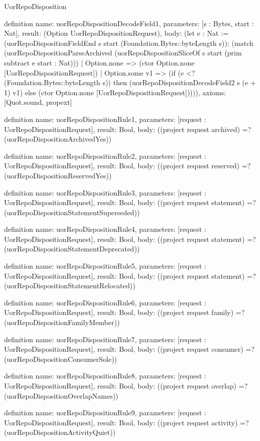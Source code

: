 \begin{lexlean}{UorRepoDisposition}
\begin{semanticmodule}
definition{
  name: uorRepoDispositionDecodeField1,
  parameters: [s : Bytes, start : Nat],
  result: (Option UorRepoDispositionRequest),
  body: (let e : Nat := (uorRepoDispositionFieldEnd s start (Foundation.Bytes::byteLength s)); (match (uorRepoDispositionParseArchived (uorRepoDispositionSliceOf s start (prim subtract e start : Nat)))
    | Option.none => (ctor Option.none [UorRepoDispositionRequest])
    | Option.some v1 => (if (e <? (Foundation.Bytes::byteLength s)) then (uorRepoDispositionDecodeField2 s (e + 1) v1) else (ctor Option.none [UorRepoDispositionRequest])))),
  axioms: [Quot.sound, propext]
}

definition{
  name: uorRepoDispositionRule1,
  parameters: [request : UorRepoDispositionRequest],
  result: Bool,
  body: ((project request archived) =? (uorRepoDispositionArchivedYes))
}

definition{
  name: uorRepoDispositionRule2,
  parameters: [request : UorRepoDispositionRequest],
  result: Bool,
  body: ((project request reserved) =? (uorRepoDispositionReservedYes))
}

definition{
  name: uorRepoDispositionRule3,
  parameters: [request : UorRepoDispositionRequest],
  result: Bool,
  body: ((project request statement) =? (uorRepoDispositionStatementSuperseded))
}

definition{
  name: uorRepoDispositionRule4,
  parameters: [request : UorRepoDispositionRequest],
  result: Bool,
  body: ((project request statement) =? (uorRepoDispositionStatementDeprecated))
}

definition{
  name: uorRepoDispositionRule5,
  parameters: [request : UorRepoDispositionRequest],
  result: Bool,
  body: ((project request statement) =? (uorRepoDispositionStatementRelocated))
}

definition{
  name: uorRepoDispositionRule6,
  parameters: [request : UorRepoDispositionRequest],
  result: Bool,
  body: ((project request family) =? (uorRepoDispositionFamilyMember))
}

definition{
  name: uorRepoDispositionRule7,
  parameters: [request : UorRepoDispositionRequest],
  result: Bool,
  body: ((project request consumer) =? (uorRepoDispositionConsumerSole))
}

definition{
  name: uorRepoDispositionRule8,
  parameters: [request : UorRepoDispositionRequest],
  result: Bool,
  body: ((project request overlap) =? (uorRepoDispositionOverlapNames))
}

definition{
  name: uorRepoDispositionRule9,
  parameters: [request : UorRepoDispositionRequest],
  result: Bool,
  body: ((project request activity) =? (uorRepoDispositionActivityQuiet))
}


\end{semanticmodule}
\end{lexlean}
